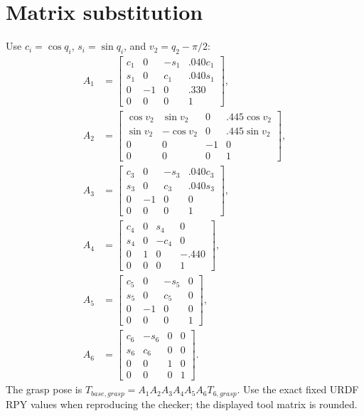\section{Matrix substitution}
Use $c_i=\cos q_i$, $s_i=\sin q_i$, and $v_2=q_2-\pi/2$:
\begin{align*}
A_1&=\begin{bmatrix}c_1&0&-s_1&.040c_1\\s_1&0&c_1&.040s_1\\0&-1&0&.330\\0&0&0&1\end{bmatrix},\\
A_2&=\begin{bmatrix}\cos v_2&\sin v_2&0&.445\cos v_2\\\sin v_2&-\cos v_2&0&.445\sin v_2\\0&0&-1&0\\0&0&0&1\end{bmatrix},\\
A_3&=\begin{bmatrix}c_3&0&-s_3&.040c_3\\s_3&0&c_3&.040s_3\\0&-1&0&0\\0&0&0&1\end{bmatrix},\\
A_4&=\begin{bmatrix}c_4&0&s_4&0\\s_4&0&-c_4&0\\0&1&0&-.440\\0&0&0&1\end{bmatrix},\\
A_5&=\begin{bmatrix}c_5&0&-s_5&0\\s_5&0&c_5&0\\0&-1&0&0\\0&0&0&1\end{bmatrix},\\
A_6&=\begin{bmatrix}c_6&-s_6&0&0\\s_6&c_6&0&0\\0&0&1&0\\0&0&0&1\end{bmatrix}.
\end{align*}
The grasp pose is $T_{base,grasp}=A_1A_2A_3A_4A_5A_6T_{6,grasp}$. Use the
exact fixed URDF RPY values when reproducing the checker; the displayed tool
matrix is rounded.
